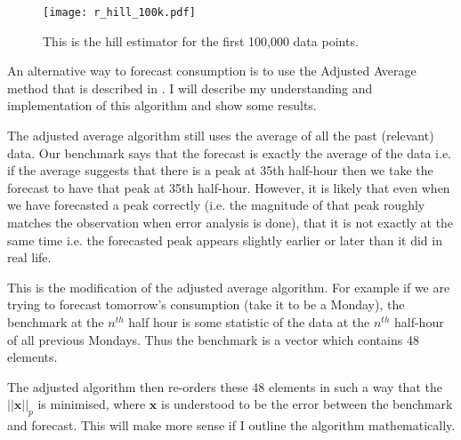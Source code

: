 \documentclass[a4paper]{article}
\begin{document}
\begin{figure}
\centering
\texttt{[image: r\_hill\_100k.pdf]}
\caption{\label{fig:hill_100k} This is the hill estimator for the first 100,000 data points.}
\end{figure}

An alternative way to forecast consumption is to use the Adjusted Average method that is described in \cite{Dan14}. I will describe my understanding and implementation of this algorithm and show some results.

The adjusted average algorithm still uses the average of all the past (relevant) data. Our benchmark says that the forecast is exactly the average  of the data i.e. if the average suggests that there is a peak at 35th half-hour then we take the forecast to have that peak at 35th half-hour. However, it is likely that even when we have forecasted a peak correctly (i.e. the magnitude of that peak roughly matches the observation when error analysis is done), that it is not exactly at the same time i.e. the forecasted peak appears slightly earlier or later than it did in real life.

This is the modification of the adjusted average algorithm. For example if we are trying to forecast tomorrow's consumption (take it to be a Monday), the benchmark at the $n^{th}$ half hour is some statistic of the data at the $n^{th}$ half-hour of all previous Mondays. Thus the benchmark is a vector which contains 48 elements.

The adjusted algorithm then re-orders these 48 elements in such a way that the $||\textbf{x}||_p$ is minimised, where $\textbf{x}$ is understood to be the error between the benchmark and forecast. This will make more sense if I outline the algorithm mathematically.
\end{document}
